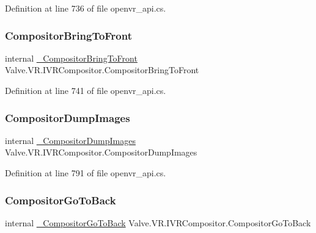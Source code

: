 Definition at line 736 of file openvr\+\_\+api.\+cs.

\mbox{\label{struct_valve_1_1_v_r_1_1_i_v_r_compositor_ae584ac5635dcc4a157efdf90e5c04662}} 
\subsubsection{\texorpdfstring{CompositorBringToFront}{CompositorBringToFront}}
{\footnotesize\ttfamily internal \mbox{\hyperlink{struct_valve_1_1_v_r_1_1_i_v_r_compositor_a0a02f8e41398d3129dea3bf9ba3a8a25}{\+\_\+\+Compositor\+Bring\+To\+Front}} Valve.\+V\+R.\+I\+V\+R\+Compositor.\+Compositor\+Bring\+To\+Front}



Definition at line 741 of file openvr\+\_\+api.\+cs.

\mbox{\label{struct_valve_1_1_v_r_1_1_i_v_r_compositor_a3fead654c9ee024f9b7becf3150f5214}} 
\subsubsection{\texorpdfstring{CompositorDumpImages}{CompositorDumpImages}}
{\footnotesize\ttfamily internal \mbox{\hyperlink{struct_valve_1_1_v_r_1_1_i_v_r_compositor_a351b398aced3747ea129a949a86c5293}{\+\_\+\+Compositor\+Dump\+Images}} Valve.\+V\+R.\+I\+V\+R\+Compositor.\+Compositor\+Dump\+Images}



Definition at line 791 of file openvr\+\_\+api.\+cs.

\mbox{\label{struct_valve_1_1_v_r_1_1_i_v_r_compositor_aa88d54da01f8620a3c0c53c031c0025d}} 
\subsubsection{\texorpdfstring{CompositorGoToBack}{CompositorGoToBack}}
{\footnotesize\ttfamily internal \mbox{\hyperlink{struct_valve_1_1_v_r_1_1_i_v_r_compositor_ad0df5d7509e71103e962c8b331d6cfd5}{\+\_\+\+Compositor\+Go\+To\+Back}} Valve.\+V\+R.\+I\+V\+R\+Compositor.\+Compositor\+Go\+To\+Back}



